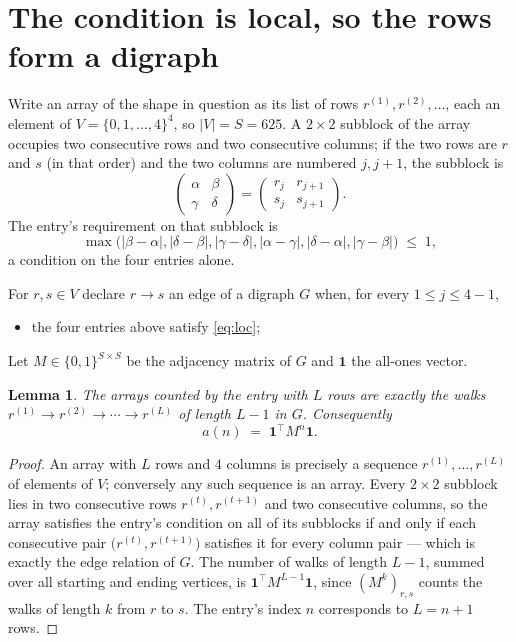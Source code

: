 \documentclass[11pt,a4paper]{article}
\theoremstyle{plain}
\newtheorem{lemma}[theorem]{Lemma}
\theoremstyle{definition}
\begin{document}
\section{The condition is local, so the rows form a digraph}

Write an array of the shape in question as its list of rows
$r^{(1)},r^{(2)},\dots$, each an element of
$V=\{0,1,\dots,4\}^{4}$, so $|V|=S=625$. A $2\times2$ subblock of the array
occupies two consecutive rows and two consecutive columns; if the two rows are $r$
and $s$ (in that order) and the two columns are numbered $j,j+1$,
the subblock is
\[
\begin{pmatrix}\alpha&\beta\\\gamma&\delta\end{pmatrix}=\begin{pmatrix}r_j&r_{j+1}\\s_j&s_{j+1}\end{pmatrix}.
\]
The entry's requirement on that subblock is
\begin{equation}\label{eq:loc}
\max\bigl(|\beta-\alpha|,|\delta-\beta|,|\gamma-\delta|,|\alpha-\gamma|,|\delta-\alpha|,|\gamma-\beta|\bigr)\;\le\;1,
\end{equation}
a condition on the four entries alone.

For $r,s\in V$ declare $r\to s$ an edge of a digraph $G$ when, for every
$1\le j\le 4-1$,
\begin{itemize}
\item the four entries above satisfy \eqref{eq:loc};

\end{itemize}
Let $M\in\{0,1\}^{S\times S}$ be the adjacency matrix of $G$ and $\mathbf{1}$ the
all-ones vector.

\begin{lemma}\label{lem:walk}
The arrays counted by the entry with $L$ rows are exactly the walks
$r^{(1)}\to r^{(2)}\to\cdots\to r^{(L)}$ of length $L-1$ in $G$. Consequently
\[
a(n)\;=\;\mathbf{1}^{\!\top}M^{n}\mathbf{1} .
\]
\end{lemma}

\begin{proof}
An array with $L$ rows and $4$ columns is precisely a sequence
$r^{(1)},\dots,r^{(L)}$ of elements of $V$; conversely any such sequence is an array.
Every $2\times2$ subblock lies in two consecutive rows $r^{(t)},r^{(t+1)}$ and two
consecutive columns, so the array satisfies the entry's condition on all of its subblocks
if and only if each consecutive pair $\bigl(r^{(t)},r^{(t+1)}\bigr)$ satisfies it for
every column pair --- which is exactly the edge relation of $G$. The number of walks of
length $L-1$, summed over all starting and ending vertices, is
$\mathbf{1}^{\!\top}M^{L-1}\mathbf{1}$, since $(M^{k})_{r,s}$ counts the walks of
length $k$ from $r$ to $s$. The entry's index $n$ corresponds to $L=n+1$ rows.
\end{proof}
\end{document}
